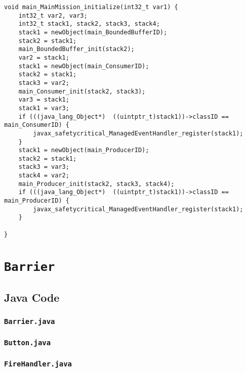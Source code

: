 \begin{landscape}
\begin{multicols}{2}
\begin{lstlisting}[firstnumber=2505]
void main_MainMission_initialize(int32_t var1) {
	int32_t var2, var3;
	int32_t stack1, stack2, stack3, stack4;
	stack1 = newObject(main_BoundedBufferID);
	stack2 = stack1;
	main_BoundedBuffer_init(stack2);
	var2 = stack1;
	stack1 = newObject(main_ConsumerID);
	stack2 = stack1;
	stack3 = var2;
	main_Consumer_init(stack2, stack3);
	var3 = stack1;
	stack1 = var3;
	if (((java_lang_Object*)  ((uintptr_t)stack1))->classID == main_ConsumerID) {
		javax_safetycritical_ManagedEventHandler_register(stack1);
	}
	stack1 = newObject(main_ProducerID);
	stack2 = stack1;
	stack3 = var3;
	stack4 = var2;
	main_Producer_init(stack2, stack3, stack4);
	if (((java_lang_Object*)  ((uintptr_t)stack1))->classID == main_ProducerID) {
		javax_safetycritical_ManagedEventHandler_register(stack1);
	}

}
\end{lstlisting}

\section{\texorpdfstring{\texttt{Barrier}}{Barrier}}
\label{Barrier-code-section}

\subsection{Java Code}
\label{Barrier-java-code-subsection}

\subsubsection{\texttt{Barrier.java}}


\subsubsection{\texttt{Button.java}}


\subsubsection{\texttt{FireHandler.java}}



\end{multicols}
\end{landscape}
